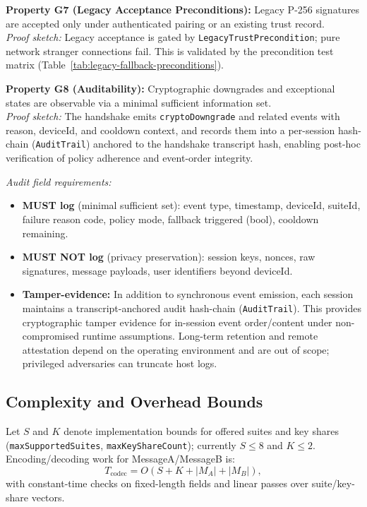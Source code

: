 \documentclass[10pt,journal,compsoc]{IEEEtran}
\providecommand{\tightlist}{%
  \setlength{\itemsep}{0pt}\setlength{\parskip}{0pt}}
\begin{document}
\textbf{Property G7 (Legacy Acceptance Preconditions):} Legacy P-256
signatures are accepted only under authenticated pairing or an existing
trust record.\\
\emph{Proof sketch:} Legacy acceptance is gated by
\texttt{Legacy\allowbreak Trust\allowbreak Precondition}; pure network stranger connections fail.
This is validated by the precondition test matrix (Table~\ref{tab:legacy-fallback-preconditions}).

\textbf{Property G8 (Auditability):} Cryptographic downgrades and
exceptional states are observable via a minimal sufficient information set.\\
\emph{Proof sketch:} The handshake emits
\texttt{cryptoDowngrade} and related events with reason,
deviceId, and cooldown context, and records them into a per-session
hash-chain (\texttt{AuditTrail}) anchored to the handshake transcript hash,
enabling post-hoc verification of policy adherence and event-order integrity.

\emph{Audit field requirements:}
\begin{itemize}\tightlist
\item \textbf{MUST log} (minimal sufficient set): event type, timestamp, deviceId, suiteId, failure reason code, policy mode, fallback triggered (bool), cooldown remaining.
\item \textbf{MUST NOT log} (privacy preservation): session keys, nonces, raw signatures, message payloads, user identifiers beyond deviceId.
\item \textbf{Tamper-evidence:} In addition to synchronous event emission, each session maintains a transcript-anchored audit hash-chain (\texttt{AuditTrail}). This provides cryptographic tamper evidence for in-session event order/content under non-compromised runtime assumptions. Long-term retention and remote attestation depend on the operating environment and are out of scope; privileged adversaries can truncate host logs.
\end{itemize}

\subsection{Complexity and Overhead Bounds}\label{sec:complexity-bounds}

Let $S$ and $K$ denote implementation bounds for offered suites and key
shares (\texttt{maxSupportedSuites}, \texttt{maxKeyShareCount});
currently $S \le 8$ and $K \le 2$. Encoding/decoding work for
MessageA/MessageB is:
\[
T_{\mathrm{codec}} = O(S + K + |M_A| + |M_B|),
\]
with constant-time checks on fixed-length fields and linear passes over
suite/key-share vectors.
\end{document}
